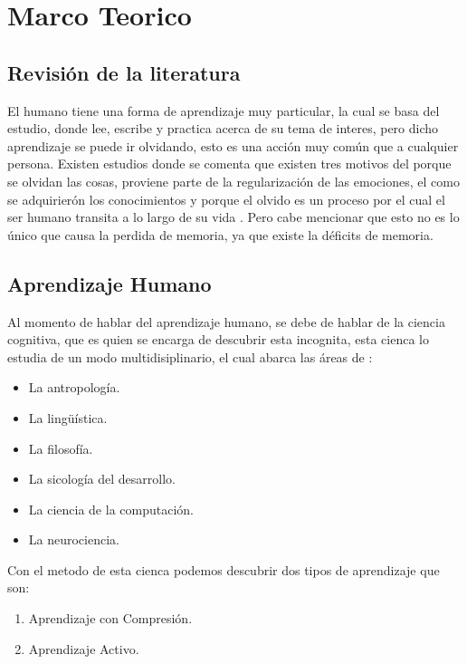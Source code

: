 \section{Marco Teorico}

    \subsection{Revisión de la literatura}
        El humano tiene una forma de aprendizaje muy particular, la cual se basa del estudio, donde lee, escribe y practica acerca de
        su tema de interes, pero dicho aprendizaje se puede ir olvidando, esto es una acción muy común que a cualquier persona.
        Existen estudios donde se comenta que existen tres motivos del porque se olvidan las cosas, proviene parte de la regularización de las emociones,
        el como se adquirierón los conocimientos y porque el olvido es un proceso por el cual el ser humano transita a lo largo de su vida \cite{Nrby2015}. Pero cabe
        mencionar que esto no es lo único que causa la perdida de memoria, ya que existe la déficits de memoria. 

    \subsection{Aprendizaje Humano}
        Al momento de hablar del aprendizaje humano, se debe de hablar de la ciencia cognitiva, que es quien se encarga de descubrir esta incognita,
        esta cienca lo estudia de un modo multidisiplinario, el cual abarca las \'areas de \cite{bransford2000}: 
        \begin{itemize}
            \item La antropología.
            \item La lingüística.
            \item La filosofía.
            \item La sicología del desarrollo.
            \item La ciencia de la computación. 
            \item La neurociencia.
        \end{itemize}
        Con el metodo de esta cienca podemos descubrir dos tipos de aprendizaje que son:
        \begin{enumerate}
            \item Aprendizaje con Compresi\'on.
            \item Aprendizaje Activo.
        \end{enumerate}
